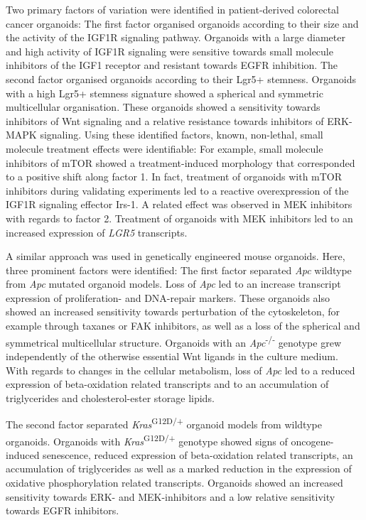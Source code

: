 Two primary factors of variation were identified in patient-derived colorectal cancer organoids: The first factor organised organoids according to their size and the activity of the IGF1R signaling pathway. Organoids with a large diameter and high activity of IGF1R signaling were sensitive towards small molecule inhibitors of the IGF1 receptor and resistant towards EGFR inhibition. 
\smallbreak
The second factor organised organoids according to their Lgr5+ stemness. Organoids with a high Lgr5+ stemness signature showed a spherical and symmetric multicellular organisation. These organoids showed a sensitivity towards inhibitors of Wnt signaling and a relative resistance towards inhibitors of ERK-MAPK signaling.
\smallbreak
Using these identified factors, known, non-lethal, small molecule treatment effects were identifiable: For example, small molecule inhibitors of mTOR showed a treatment-induced morphology that corresponded to a positive shift along factor 1. In fact, treatment of organoids with mTOR inhibitors during validating experiments led to a reactive overexpression of the IGF1R signaling effector Irs-1. A related effect was observed in MEK inhibitors with regards to factor 2. Treatment of organoids with MEK inhibitors led to an increased expression of \textit{LGR5} transcripts.
\bigbreak

A similar approach was used in genetically engineered mouse organoids. Here, three prominent factors were identified: The first factor separated \textit{Apc} wildtype from \textit{Apc} mutated organoid models. Loss of \textit{Apc} led to an increase transcript expression of proliferation- and DNA-repair markers. These organoids also showed an increased sensitivity towards perturbation of the cytoskeleton, for example through taxanes or FAK inhibitors, as well as a loss of the spherical and symmetrical multicellular structure. Organoids with an \textit{Apc}\textsuperscript{-/-} genotype grew independently of the otherwise essential Wnt ligands in the culture medium. With regards to changes in the cellular metabolism, loss of \textit{Apc} led to a reduced expression of beta-oxidation related transcripts and to an accumulation of triglycerides and cholesterol-ester storage lipids.
\bigbreak

The second factor separated \textit{Kras}\textsuperscript{G12D/+} organoid models from wildtype organoids. Organoids with \textit{Kras}\textsuperscript{G12D/+} genotype showed signs of oncogene-induced senescence, reduced expression of beta-oxidation related transcripts, an accumulation of triglycerides as well as a marked reduction in the expression of oxidative phosphorylation related transcripts. Organoids showed an increased sensitivity towards ERK- and MEK-inhibitors and a low relative sensitivity towards EGFR inhibitors. 
\bigbreak


